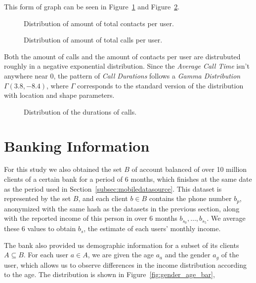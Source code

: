 This form of graph can be seen in Figure~\ref{fig:outcalls_dist} and Figure~\ref{fig:outcontacts_dist}.

\begin{figure}
\centering
{}
\caption{Distribution of amount of total contacts per user.}
\label{fig:outcalls_dist}
\end{figure}

\begin{figure}
\centering
{}
\caption{Distribution of amount of total calls per user.}
\label{fig:outcontacts_dist}
\end{figure}

Both the amount of calls and the amount of contacts per user are distrubuted roughly in a negative exponential distribution. Since the \emph{Average Call Time} isn't anywhere near 0, the pattern of \emph{Call Durations} follows a \emph{Gamma Distribution} $\Gamma \left( 3.8, -8.4 \right)$, where $\Gamma$ corresponds to the standard version of the distribution with location and shape parameters.

\begin{figure}
\centering
{}
\caption{Distribution of the durations of calls.}
\label{fig:callduration}
\end{figure}

\section{Banking Information}
\label{subsec:bank_source}

For this study we also obtained the set $B$ of account balanced of over 10 million clients of a certain bank for a period of 6 months, which finishes at the same date as the period used in Section~\ref{subsec:mobiledatasource}. This dataset is represented by the set $B$, and each client $b \in B$ contains the phone number $b_p$, anonymized with the same hash as the datasets in the previous section, along with the reported income of this person in over 6 months $b_{s_0}, \ldots, b_{s_5}$. We average these 6 values to obtain $b_s$, the estimate of each users' monthly income.

The bank also provided us demographic information for a subset of its clients $A \subseteq B$. For each user $a \in A$, we are given the age $a_a$ and the gender $a_g$ of the user, which allows us to observe differences in the income distribution according to the age. The distribution is shown in Figure~\ref{fig:gender_age_bar}, 

